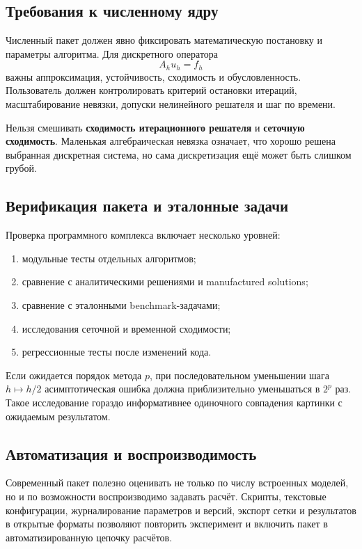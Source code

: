 \subsection{Требования к численному ядру}

Численный пакет должен явно фиксировать математическую постановку и параметры
алгоритма. Для дискретного оператора
\[
A_hu_h=f_h
\]
важны аппроксимация, устойчивость, сходимость и обусловленность. Пользователь
должен контролировать критерий остановки итераций, масштабирование невязки,
допуски нелинейного решателя и шаг по времени.

Нельзя смешивать \textbf{сходимость итерационного решателя} и
\textbf{сеточную сходимость}. Маленькая алгебраическая невязка означает, что
хорошо решена выбранная дискретная система, но сама дискретизация ещё может
быть слишком грубой.

\subsection{Верификация пакета и эталонные задачи}

Проверка программного комплекса включает несколько уровней:
\begin{enumerate}
    \item модульные тесты отдельных алгоритмов;
    \item сравнение с аналитическими решениями и manufactured solutions;
    \item сравнение с эталонными benchmark-задачами;
    \item исследования сеточной и временной сходимости;
    \item регрессионные тесты после изменений кода.
\end{enumerate}

Если ожидается порядок метода $p$, при последовательном уменьшении шага
$h\mapsto h/2$ асимптотическая ошибка должна приблизительно уменьшаться в
$2^p$ раз. Такое исследование гораздо информативнее одиночного совпадения
картинки с ожидаемым результатом.

\subsection{Автоматизация и воспроизводимость}

Современный пакет полезно оценивать не только по числу встроенных моделей, но и
по возможности воспроизводимо задавать расчёт. Скрипты, текстовые
конфигурации, журналирование параметров и версий, экспорт сетки и результатов
в открытые форматы позволяют повторить эксперимент и включить пакет в
автоматизированную цепочку расчётов.

